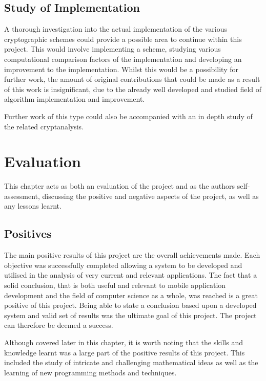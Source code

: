 \documentclass[a4paper,12pt]{report}
\begin{document}
\section{Study of Implementation}

A thorough investigation into the actual implementation of the various cryptographic schemes could provide a possible area to continue within this project. This would involve implementing a scheme, studying various computational comparison factors of the implementation and developing an improvement to the implementation. Whilst this would be a possibility for further work, the amount of original contributions that could be made as a result of this work is insignificant, due to the already well developed and studied field of algorithm implementation and improvement. 

Further work of this type could also be accompanied with an in depth study of the related cryptanalysis. 

\chapter{Evaluation}

This chapter acts as both an evaluation of the project and as the authors self-assessment, discussing the positive and negative aspects of the project, as well as any lessons learnt.

\section{Positives}

The main positive results of this project are the overall achievements made. Each objective was successfully completed allowing a system to be developed and utilised in the analysis of very current and relevant applications. The fact that a solid conclusion, that is both useful and relevant to mobile application development and the field of computer science as a whole, was reached is a great positive of this project. Being able to state a conclusion based upon a developed system and valid set of results was the ultimate goal of this project. The project can therefore be deemed a success.

Although covered later in this chapter, it is worth noting that the skills and knowledge learnt was a large part of the positive results of this project. This included the study of intricate and challenging mathematical ideas as well as the learning of new programming methods and techniques. 
\end{document}
